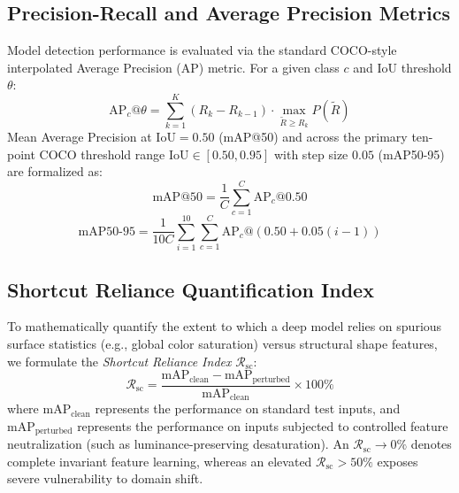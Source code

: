 \documentclass[conference]{IEEEtran}
\begin{document}
\subsection{Precision-Recall and Average Precision Metrics}
Model detection performance is evaluated via the standard COCO-style interpolated Average Precision (AP) metric. For a given class $c$ and IoU threshold $\theta$:
\begin{equation}
    \text{AP}_c@\theta = \sum_{k=1}^K (R_k - R_{k-1}) \cdot \max_{\tilde{R} \ge R_k} P(\tilde{R})
    \label{eq:ap}
\end{equation}
Mean Average Precision at $\text{IoU} = 0.50$ (mAP@50) and across the primary ten-point COCO threshold range $\text{IoU} \in [0.50, 0.95]$ with step size $0.05$ (mAP50-95) are formalized as:
\begin{equation}
    \text{mAP}@50 = \frac{1}{C} \sum_{c=1}^C \text{AP}_c@0.50
\end{equation}
\begin{equation}
    \text{mAP}50\text{-}95 = \frac{1}{10 C} \sum_{i=1}^{10} \sum_{c=1}^C \text{AP}_c@(0.50 + 0.05(i - 1))
\end{equation}

\subsection{Shortcut Reliance Quantification Index}
To mathematically quantify the extent to which a deep model relies on spurious surface statistics (e.g., global color saturation) versus structural shape features, we formulate the \textit{Shortcut Reliance Index} $\mathcal{R}_{\text{sc}}$:
\begin{equation}
    \mathcal{R}_{\text{sc}} = \frac{\text{mAP}_{\text{clean}} - \text{mAP}_{\text{perturbed}}}{\text{mAP}_{\text{clean}}} \times 100\%
    \label{eq:shortcut_reliance}
\end{equation}
where $\text{mAP}_{\text{clean}}$ represents the performance on standard test inputs, and $\text{mAP}_{\text{perturbed}}$ represents the performance on inputs subjected to controlled feature neutralization (such as luminance-preserving desaturation). An $\mathcal{R}_{\text{sc}} \to 0\%$ denotes complete invariant feature learning, whereas an elevated $\mathcal{R}_{\text{sc}} > 50\%$ exposes severe vulnerability to domain shift.
\end{document}
